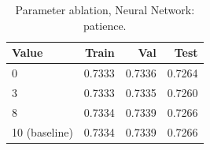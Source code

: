 \begin{table}[ht]
\centering
\small
\caption{Parameter ablation, Neural Network: patience.}
\label{tab:ablation-neural-patience}
\begin{tabular}{lrrr}
\toprule
Value & Train & Val & Test \\
\midrule
0 & 0.7333 & 0.7336 & 0.7264 \\
3 & 0.7333 & 0.7335 & 0.7260 \\
8 & 0.7334 & 0.7339 & 0.7266 \\
10 (baseline) & 0.7334 & 0.7339 & 0.7266 \\
\bottomrule
\end{tabular}
\end{table}

